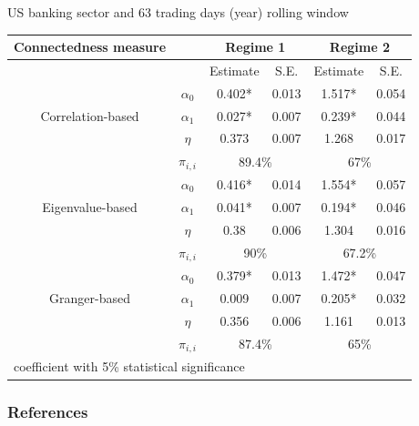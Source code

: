 \documentclass{beamer}
\begin{document}
\begin{frame}
    US banking sector and 63 trading days (year) rolling window
    \begin{table}\small
        \begin{tabular}{cccccc}
          \toprule
           Connectedness measure &  & \multicolumn{2}{c}{\bfseries Regime 1} & \multicolumn{2}{c}{\bfseries Regime 2}  \\
           \hline
           & & Estimate & S.E. & Estimate & S.E. \\
           \hline
           \multirow{3}{*}[\normalbaselineskip]{Correlation-based} & $\alpha_0$ & 0.402* & 0.013 & 1.517*  & 0.054 \\
            & $\alpha_1$ & 0.027* & 0.007 & 0.239* & 0.044 \\
            & $\eta$ & 0.373 & 0.007 & 1.268 & 0.017 \\
            & $\pi_{i,i}$ &  \multicolumn{2}{c}{89.4\%} & \multicolumn{2}{c}{67\%}\\
            \hline
            \multirow{3}{*}[\normalbaselineskip]{Eigenvalue-based} & $\alpha_0$ & 0.416* & 0.014 & 1.554*  & 0.057 \\
            & $\alpha_1$ & 0.041* & 0.007 & 0.194* & 0.046 \\
            & $\eta$ & 0.38 & 0.006 & 1.304 & 0.016 \\
            & $\pi_{i,i}$ &  \multicolumn{2}{c}{90\%} & \multicolumn{2}{c}{67.2\%}\\
            \hline
            \multirow{3}{*}[\normalbaselineskip]{Granger-based} & $\alpha_0$ & 0.379* & 0.013 & 1.472*  & 0.047 \\
            & $\alpha_1$ & 0.009 & 0.007 & 0.205* & 0.032 \\
            & $\eta$ & 0.356 & 0.006 & 1.161 & 0.013 \\
            & $\pi_{i,i}$ &  \multicolumn{2}{c}{87.4\%} & \multicolumn{2}{c}{65\%}\\
            \hline
          \multicolumn{6}{l}{\footnotesize * coefficient with 5\% statistical significance} \\
          \hline
        \end{tabular}
      \end{table}

\end{frame}    

\begin{frame}[allowframebreaks]
    \frametitle{References}
      \printbibliography
\end{frame}
\end{document}
